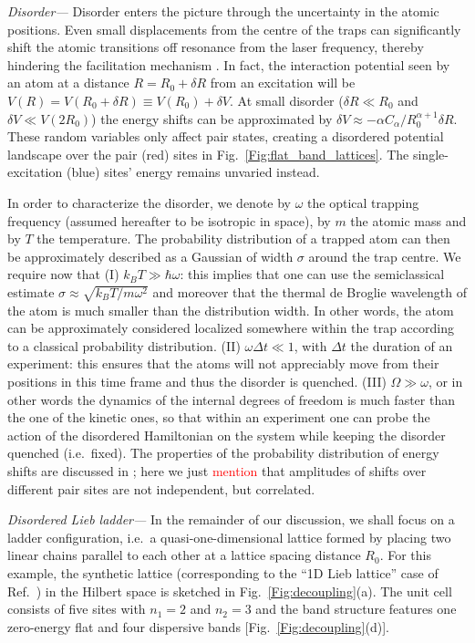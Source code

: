 \documentclass[prl,aps,twocolumn,showpacs,superscriptaddress,longbibliography]{revtex4-1}
\newcommand{\changer}[1]{\textcolor{red}{#1}}
\begin{document}
\emph{Disorder---} Disorder enters the picture through the uncertainty in the atomic positions. Even small displacements from the centre of the traps can significantly shift the atomic transitions off resonance from the laser frequency, thereby hindering the facilitation mechanism \cite{a_Marcuzzi_PRL_17}. In fact, the interaction potential seen by an atom at a distance $R = R_0 + \delta R$ from an excitation will be $V(R) = V(R_0 + \delta R) \equiv V(R_0) + \delta V$. 
At small disorder ($\delta R \ll R_0$ and $\delta V \ll V(2R_0)$) the energy shifts can be approximated by $\delta V \approx -\alpha C_\alpha / R_0^{\alpha + 1} \delta R$. These random variables only affect pair states, creating a disordered potential landscape over the pair (red) sites in Fig.~\ref{Fig:flat_band_lattices}. The single-excitation (blue) sites' energy remains unvaried instead.

In order to characterize the disorder, we denote by $\omega$ the optical trapping frequency (assumed hereafter to be isotropic in space), by $m$ the atomic mass and by $T$ the temperature. The probability distribution of a trapped atom can then be approximately described as a Gaussian of width $\sigma$ around the trap centre. We require now that (I) $k_B T \gg \hbar \omega$: this implies that one can use the semiclassical estimate $\sigma \approx \sqrt{k_B T / m\omega^2}$ and moreover that the thermal de Broglie wavelength of the atom is much smaller than the distribution width. In other words, the atom can be approximately considered localized somewhere within the trap according to a classical probability distribution. (II) $\omega \Delta t \ll 1$, with $\Delta t$ the duration of an experiment: this ensures that the atoms will not appreciably move from their positions in this time frame and thus the disorder is quenched. (III) $\Omega \gg \omega$, or in other words the dynamics of the internal degrees of freedom is much faster than the one of the kinetic ones, so that within an experiment one can probe the action of the disordered Hamiltonian on the system while keeping the disorder quenched (i.e.~fixed). The properties of the probability distribution of energy shifts are discussed in \cite{SM}; here we just \changer{mention} that amplitudes of shifts over different pair sites are not independent, but correlated.

\emph{Disordered Lieb ladder---} In the remainder of our discussion, we shall focus on a ladder configuration, i.e.~a quasi-one-dimensional lattice formed by placing two linear chains parallel to each other at a lattice spacing distance $R_0$. For this example, the synthetic lattice (corresponding to the ``1D Lieb lattice'' case of Ref.~\cite{Leykam2017}) in the Hilbert space is sketched in Fig.~\ref{Fig:decoupling}(a). The unit cell consists of five sites with $n_1 = 2$ and $n_2 = 3$ and the band structure features one zero-energy flat and four dispersive bands [Fig.~\ref{Fig:decoupling}(d)].
\end{document}
